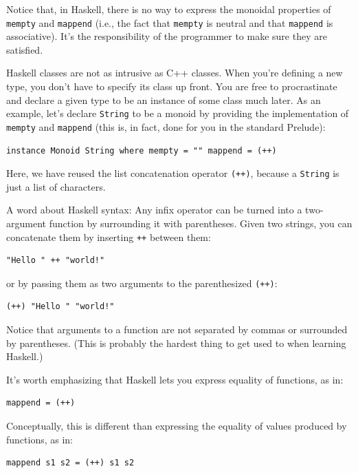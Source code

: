 Notice that, in Haskell, there is no way to express the monoidal
properties of \texttt{mempty} and \texttt{mappend} (i.e., the fact that
\texttt{mempty} is neutral and that \texttt{mappend} is associative).
It's the responsibility of the programmer to make sure they are
satisfied.

Haskell classes are not as intrusive as C++ classes. When you're
defining a new type, you don't have to specify its class up front. You
are free to procrastinate and declare a given type to be an instance of
some class much later. As an example, let's declare \texttt{String} to
be a monoid by providing the implementation of \texttt{mempty} and
\texttt{mappend} (this is, in fact, done for you in the standard
Prelude):

\begin{verbatim}
instance Monoid String where mempty = "" mappend = (++)
\end{verbatim}

Here, we have reused the list concatenation operator \texttt{(++)},
because a \texttt{String} is just a list of characters.

A word about Haskell syntax: Any infix operator can be turned into a
two-argument function by surrounding it with parentheses. Given two
strings, you can concatenate them by inserting \texttt{++} between them:

\begin{verbatim}
"Hello " ++ "world!"
\end{verbatim}

or by passing them as two arguments to the parenthesized \texttt{(++)}:

\begin{verbatim}
(++) "Hello " "world!"
\end{verbatim}

Notice that arguments to a function are not separated by commas or
surrounded by parentheses. (This is probably the hardest thing to get
used to when learning Haskell.)

It's worth emphasizing that Haskell lets you express equality of
functions, as in:

\begin{verbatim}
mappend = (++)
\end{verbatim}

Conceptually, this is different than expressing the equality of values
produced by functions, as in:

\begin{verbatim}
mappend s1 s2 = (++) s1 s2
\end{verbatim}

